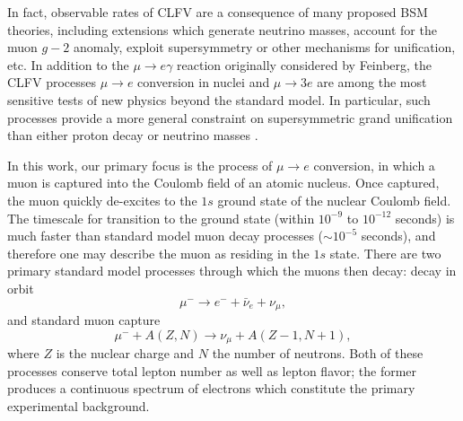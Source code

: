 \documentclass{book}[12pt]
\begin{document}
In fact, observable rates of CLFV are a consequence of many proposed BSM theories, including extensions which generate neutrino masses, account for the muon $g-2$ anomaly, exploit supersymmetry or other mechanisms for unification, etc. In addition to the $\mu\rightarrow e\gamma$ reaction originally considered by Feinberg, the CLFV processes $\mu\rightarrow e$ conversion in nuclei and $\mu\rightarrow 3e$ are among the most sensitive tests of new physics beyond the standard model. In particular, such processes provide a more general constraint on supersymmetric grand unification than either proton decay or neutrino masses \citep{Barbieri_1994}.

In this work, our primary focus is the process of $\mu\rightarrow e$ conversion, in which a muon is captured into the Coulomb field of an atomic nucleus. 
Once captured, the muon quickly  de-excites to the $1s$ ground state of the nuclear Coulomb field. The timescale for transition to the ground state (within $10^{-9}$ to $10^{-12}$ seconds) is much faster than standard model muon decay processes ($\sim 10^{-5}$ seconds), and therefore one may describe the muon as residing in the $1s$ state. There are two primary standard model processes through which the muons then decay: decay in orbit
\begin{equation}
\mu^-\rightarrow e^- + \bar{\nu}_e+\nu_{\mu},
\end{equation}
and standard muon capture
\begin{equation}
\mu^- + A(Z,N)\rightarrow \nu_{\mu}+A(Z-1,N+1),
\end{equation}
where $Z$ is the nuclear charge and $N$ the number of neutrons. Both of these processes conserve total lepton number as well as lepton flavor; the former produces a continuous spectrum of electrons which constitute the primary experimental background. 
\end{document}
